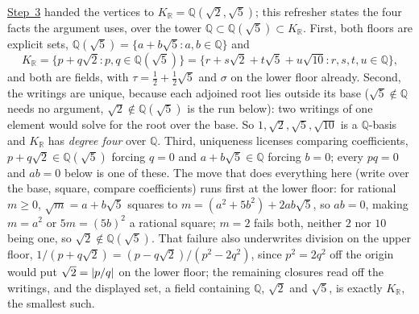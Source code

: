 \documentclass[11pt,a4paper]{article}
\newcommand{\R}{\mathbb{R}}
\newcommand{\phig}{\tau}      %
\newcommand{\invphig}{\sigma} %
\DeclarePairedDelimiter{\abs}{\lvert}{\rvert}
\begin{document}
\hyperref[sec:decker:step3]{Step~3} handed the vertices to $K_\R = \mathbb{Q}(\sqrt{2},\sqrt{5})$; this refresher states the four facts the argument uses, over the tower $\mathbb{Q} \subset \mathbb{Q}(\sqrt{5}) \subset K_\R$. First, both floors are explicit sets, $\mathbb{Q}(\sqrt{5}) = \{ a + b\sqrt{5} : a, b \in \mathbb{Q} \}$ and
$$ K_\R = \{ p + q\sqrt{2} : p, q \in \mathbb{Q}(\sqrt{5}) \} = \{ r + s\sqrt{2} + t\sqrt{5} + u\sqrt{10} : r, s, t, u \in \mathbb{Q} \}, $$
and both are fields, with $\phig = \tfrac{1}{2} + \tfrac{1}{2}\sqrt{5}$ and $\invphig$ on the lower floor already. Second, the writings are unique, because each adjoined root lies outside its base ($\sqrt{5} \notin \mathbb{Q}$ needs no argument, $\sqrt{2} \notin \mathbb{Q}(\sqrt{5})$ is the run below): two writings of one element would solve for the root over the base. So $1, \sqrt{2}, \sqrt{5}, \sqrt{10}$ is a $\mathbb{Q}$-basis and $K_\R$ has \textit{degree four} over $\mathbb{Q}$. Third, uniqueness licenses comparing coefficients, $p + q\sqrt{2} \in \mathbb{Q}(\sqrt{5})$ forcing $q = 0$ and $a + b\sqrt{5} \in \mathbb{Q}$ forcing $b = 0$; every $pq = 0$ and $ab = 0$ below is one of these. The move that does everything here (write over the base, square, compare coefficients) runs first at the lower floor: for rational $m \geq 0$, $\sqrt{m} = a + b\sqrt{5}$ squares to $m = (a^2 + 5b^2) + 2ab\sqrt{5}$, so $ab = 0$, making $m = a^2$ or $5m = (5b)^2$ a rational square; $m = 2$ fails both, neither $2$ nor $10$ being one, so $\sqrt{2} \notin \mathbb{Q}(\sqrt{5})$. That failure also underwrites division on the upper floor, $1/(p + q\sqrt{2}) = (p - q\sqrt{2})/(p^2 - 2q^2)$, since $p^2 = 2q^2$ off the origin would put $\sqrt{2} = \abs{p/q}$ on the lower floor; the remaining closures read off the writings, and the displayed set, a field containing $\mathbb{Q}$, $\sqrt{2}$ and $\sqrt{5}$, is exactly $K_\R$, the smallest such.
\end{document}
